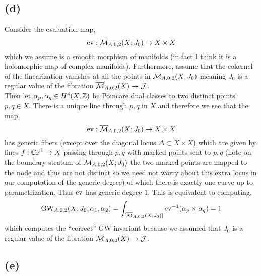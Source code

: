\documentclass[12pt]{article}
\begin{document}
\subsection{(d)}

Consider the evaluation map,
\[ \mathrm{ev} : \overline{\mathcal{M}}_{A,0,2}(X; J_0) \to X \times X \]
which we assume is a smooth morphism of manifolds (in fact I think it is a holomorphic map of complex manifolds). Furthermore, assume that the cokernel of the linearization vanishes at all the points in $\overline{\mathcal{M}}_{A,0,2}(X; J_0)$ meaning $J_0$ is a regular value of the fibration $\overline{\mathcal{M}}_{A,0,2}(X) \to \mathcal{J}$.
\bigskip\\
Then let $\alpha_p, \alpha_q \in H^4(X, \mathbb{Z})$ be Poincare dual classes to two distinct points $p,q \in X$. There is a unique line through $p,q$ in $X$ and therefore we see that the map,
\[ \mathrm{ev} : \overline{\mathcal{M}}_{A,0,2}(X; J_0) \to X \times X \]
has generic fibers (except over the diagonal locus $\Delta \subset X \times X$) which are given by lines $f : \mathbb{CP}^1 \to X$ passing through $p,q$ with marked points sent to $p,q$ (note on the boundary stratum of $\overline{\mathcal{M}}_{A,0,2}(X; J_0)$ the two marked points are mapped to the node and thus are not distinct so we need not worry about this extra locus in our computation of the generic degree) of which there is exactly one curve up to parametrization. Thus $\mathrm{ev}$ has generic degree $1$. This is equivalent to computing,
\[ \mathrm{GW}_{A,0,2}(X; J_0; \alpha_1, \alpha_2) = \int_{[\overline{\mathcal{M}}_{A,0,2}(X; J_0)]} \mathrm{ev}^{-1}(\alpha_p \times \alpha_q) = 1 \]
which computes the ``correct'' GW invariant because we assumed that $J_0$ is a regular value of the fibration $\overline{\mathcal{M}}_{A,0,2}(X) \to \mathcal{J}$. 

\subsection{(e)}
\end{document}
